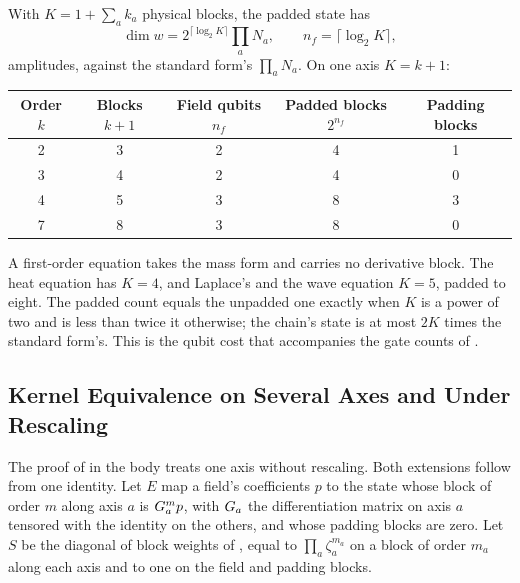 With $K=1+\sum_ak_a$ physical blocks, the padded state has
\begin{equation}
    \dim w = 2^{\lceil\log_2K\rceil}\prod_aN_a,
    \qquad
    n_f=\lceil\log_2K\rceil ,
    \label{eq:app-padded-count}
\end{equation}
amplitudes, against the standard form's $\prod_aN_a$. On one axis $K=k+1$:

\begin{center}
\begin{tabular}{ccccc}
\toprule
Order $k$ & Blocks $k+1$ & Field qubits $n_f$ & Padded blocks $2^{n_f}$ & Padding blocks \\
\midrule
2 & 3 & 2 & 4 & 1 \\
3 & 4 & 2 & 4 & 0 \\
4 & 5 & 3 & 8 & 3 \\
7 & 8 & 3 & 8 & 0 \\
\bottomrule
\end{tabular}
\end{center}

A first-order equation takes the mass form and carries no derivative block. The heat equation has $K=4$, and Laplace's and the wave equation $K=5$, padded to eight. The padded count equals the unpadded one exactly when $K$ is a power of two and is less than twice it otherwise; the chain's state is at most $2K$ times the standard form's. This is the qubit cost that accompanies the gate counts of .

\subsection{Kernel Equivalence on Several Axes and Under Rescaling}
\label{app:proof-kernel-equivalence}

The proof of  in the body treats one axis without rescaling. Both extensions follow from one identity. Let $E$ map a field's coefficients $p$ to the state whose block of order $m$ along axis $a$ is $G_a^mp$, with $G_a$ the differentiation matrix on axis $a$ tensored with the identity on the others, and whose padding blocks are zero. Let $S$ be the diagonal of block weights of , equal to $\prod_a\zeta_a^{m_a}$ on a block of order $m_a$ along each axis and to one on the field and padding blocks.

